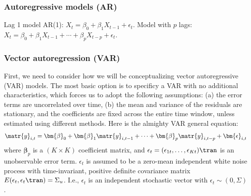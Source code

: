 \subsubsection{Autoregressive models (AR)}
Lag 1 model AR(1): $X_t = \beta_0 + \beta_1 X_{t - 1} + \epsilon_t$. Model with $p$ lags: $X_t = \beta_0 + \beta_1 X_{t - 1} + \cdots + \beta_p X_{t - p} + \epsilon_t$.

\subsubsection{Vector autoregression (VAR)}
First, we need to consider how we will be conceptualizing vector autoregressive (VAR) models. The most basic option is to specificy a VAR with no additional characteristics, which forces us to adopt the following assumptions: (a) the error terms are uncorrelated over time, (b) the mean and variance of the residuals are stationary, and the coefficients are fixed across the entire time window, unless estimated using different methods. Here is the almighty VAR general equation:
\begin{equation}
    \matr{y}_{i,t} = \bm{\beta}_0 + \bm{\beta}_1 \matr{y}_{i,t-1} + \cdots + \bm{\beta}_p \matr{y}_{i,t-p} + \bm{\epsilon}_{i,t}
\end{equation}
where $\bm{\beta}_p$ is a $(K \times K)$ coefficient matrix, and $\epsilon_t = (\epsilon_{1t},\ldots,\epsilon_{Kt})\tran$ is an unobservable error term. $\epsilon_t$ is assumed to be a zero-mean independent white noise process with time-invariant, positive definite covariance matrix $E(\epsilon_t,\epsilon_t\tran) = \Sigma_u$. I.e., $\epsilon_t$ is an independent stochastic vector with $\epsilon_t \sim (0, \Sigma)$.

